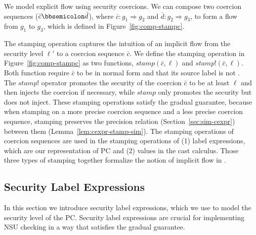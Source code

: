 We model explicit flow using security coercions. We can compose two coercion
sequences ($\bar{c} \mdoubleplus \bar{d}$), where $\bar{c} : g_1 \Rightarrow
g_2$ and $\bar{d} : g_2 \Rightarrow g_3$, to form a flow from $g_1$ to $g_3$,
which is defined in Figure~\ref{fig:comp-stampc}.

The stamping operation captures the intuition of an implicit flow from the
security level $\ell'$ to a coercion sequence $\bar{c}$. We define the stamping
operation in Figure~\ref{fig:comp-stampc} as two functions,
$\mathit{stamp}(\bar{c},\ell)$ and $\mathit{stamp!}(\bar{c},\ell)$. Both
function require $\bar{c}$ to be in normal form and that its source label is not
\unk. The $\mathit{stamp!}$ operator promotes the security of the coercion
$\bar{c}$ to be at least $\ell$ and then injects the coercion if necessary,
while $\mathit{stamp}$ only promotes the security but does not inject. These
stamping operations satisfy the gradual guarantee, because when stamping on a
more precise coercion sequence and a less precise coercion sequence, stamping
preserves the precision relation (Section~\ref{sec:sim-cexpr}) between them
(Lemma~\ref{lem:cexpr-stamp-sim}). The stamping operations of coercion sequences
are used in the stamping operations of (1) label expressions, which are our
representation of PC and (2) values in the cast calculus. Those three types of
stamping together formalize the notion of implicit flow in \Surface.

\subsection{Security Label Expressions}
\label{sec:lexpr}

In this section we introduce security label expressions, which we use
to model the security level of the PC. Security label expressions are
crucial for implementing NSU checking in a way that satisfies the
gradual guarantee.

